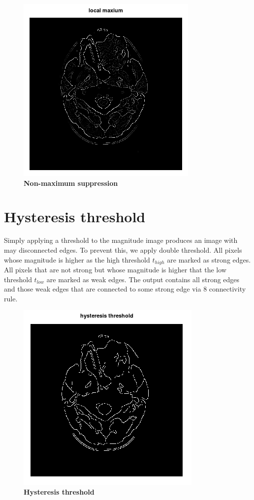 \documentclass[fleqn,moreauthors,10pt]{ds_report}
\begin{document}
\begin{figure}[h]\centering
	\includegraphics[width=0.6\linewidth]{local_max.png}
	\caption{\textbf{Non-maximum suppression}}
	\label{fig:angle}
\end{figure}

\section*{Hysteresis threshold}

Simply applying a threshold to the magnitude image produces an image with may disconnected edges. To prevent this, we apply double threshold. All pixels whose magnitude is higher as the high threshold $t_{high}$ are marked as strong edges. All pixels that are not strong but whose magnitude is higher that the low threshold $t_{low}$ are marked as weak edges. The output contains all strong edges and those weak edges that are connected to some strong edge via 8 connectivity rule.

\begin{figure}[h]\centering
	\includegraphics[width=0.6\linewidth]{threshold.png}
	\caption{\textbf{Hysteresis threshold}}
	\label{fig:threshold}
\end{figure}
\end{document}
